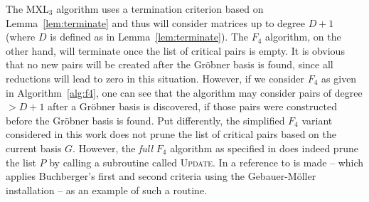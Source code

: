 The MXL$_3$ algorithm uses a termination criterion based on Lemma~\ref{lem:terminate} and thus will consider matrices up to degree $D+1$ (where $D$ is defined as in Lemma~\ref{lem:terminate}). The $F_4$ algorithm, on the other hand, will terminate once the list of critical pairs is empty. It is obvious that no new pairs will be created after the Gr\"obner basis is found, since all reductions will lead 
to zero in this situation. However, if we consider $F_4$ as given in Algorithm~\ref{alg:f4}, one can see that the algorithm may consider pairs of degree $>D+1$ after a Gr\"obner basis is discovered, if those pairs were constructed before the Gr\"obner basis is found. Put differently, the simplified $F_4$ variant considered in this work does not prune the list of critical pairs based on the current basis $G$. However, the {\em full} $F_4$ algorithm as specified in \cite[p. 69]{F4} does indeed prune the list $P$ by calling a subroutine called \textsc{Update}. In \cite{F4} a reference to \cite[p. 230]{Becker1991} is made -- which applies Buchberger's first and second criteria using the Gebauer-M\"oller installation -- as an example of such a routine. 

